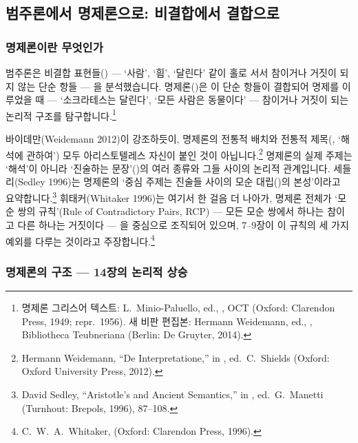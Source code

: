 \documentclass[12pt, a4paper]{article}
\begin{document}
\thispagestyle{firstpage}


\subsection{범주론에서 명제론으로: 비결합에서 결합으로}

\subsubsection{명제론이란 무엇인가}

범주론은 비결합 표현들() --- `사람', `흼', `달린다' 같이 홀로 서서 참이거나 거짓이 되지 않는 단순 항들 --- 을 분석했습니다. 명제론()은 이 단순 항들이 결합되어 명제를 이루었을 때 --- `소크라테스는 달린다', `모든 사람은 동물이다' --- 참이거나 거짓이 되는 논리적 구조를 탐구합니다.\footnote{명제론 그리스어 텍스트: L.\ Minio-Paluello, ed., , OCT (Oxford: Clarendon Press, 1949; repr.\ 1956). 새 비판 편집본: Hermann Weidemann, ed., , Bibliotheca Teubneriana (Berlin: De Gruyter, 2014).}

바이데만(Weidemann 2012)이 강조하듯이, 명제론의 전통적 배치와 전통적 제목(, `해석에 관하여') 모두 아리스토텔레스 자신이 붙인 것이 아닙니다.\footnote{Hermann Weidemann, ``De Interpretatione,'' in , ed.\ C.\ Shields (Oxford: Oxford University Press, 2012).} 명제론의 실제 주제는 `해석'이 아니라 `진술하는 문장'()의 여러 종류와 그들 사이의 논리적 관계입니다. 세들리(Sedley 1996)는 명제론의 `중심 주제는 진술들 사이의 모순 대립()의 본성'이라고 요약합니다.\footnote{David Sedley, ``Aristotle's  and Ancient Semantics,'' in , ed.\ G.\ Manetti (Turnhout: Brepols, 1996), 87--108.} 휘태커(Whitaker 1996)는 여기서 한 걸음 더 나아가, 명제론 전체가 `모순 쌍의 규칙'(Rule of Contradictory Pairs, RCP) --- 모든 모순 쌍에서 하나는 참이고 다른 하나는 거짓이다 --- 을 중심으로 조직되어 있으며, 7--9장이 이 규칙의 세 가지 예외를 다루는 것이라고 주장합니다.\footnote{C.\ W.\ A.\ Whitaker,  (Oxford: Clarendon Press, 1996).}

\subsubsection{명제론의 구조 --- 14장의 논리적 상승}
\end{document}
